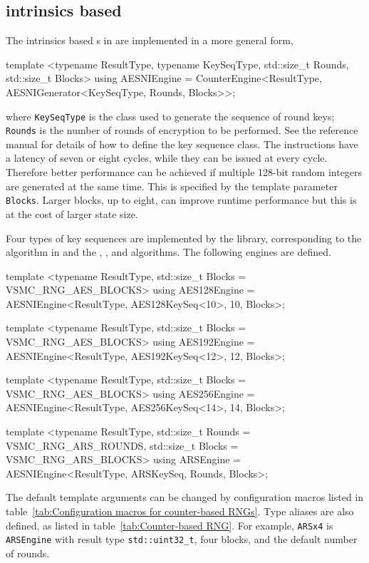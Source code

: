 \subsection{\protect\aesni intrinsics based \protect\rng}
\label{sub:AES-NI intrinsics based RNG}

The \aesni intrinsics based \rng{}s in \textcite{Salmon:2011um} are implemented
in a more general form,
\begin{cppcode}
  template <typename ResultType, typename KeySeqType, std::size_t Rounds,
      std::size_t Blocks>
  using AESNIEngine =
      CounterEngine<ResultType, AESNIGenerator<KeySeqType, Rounds, Blocks>>;
\end{cppcode}
where \verb|KeySeqType| is the class used to generate the sequence of round
keys; \verb|Rounds| is the number of rounds of \aes encryption to be performed.
See the reference manual for details of how to define the key sequence class.
The \aesni instructions have a latency of seven or eight cycles, while they can
be issued at every cycle. Therefore better performance can be achieved if
multiple 128-bit random integers are generated at the same time. This is
specified by the template parameter \verb|Blocks|. Larger blocks, up to eight,
can improve runtime performance but this is at the cost of larger state size.

Four types of key sequences are implemented by the library, corresponding to
the \ars algorithm in \textcite{Salmon:2011um} and the , , and
 algorithms. The following \rng engines are defined.
\begin{cppcode}
  template <typename ResultType, std::size_t Blocks = VSMC_RNG_AES_BLOCKS>
  using AES128Engine = AESNIEngine<ResultType, AES128KeySeq<10>, 10, Blocks>;

  template <typename ResultType, std::size_t Blocks = VSMC_RNG_AES_BLOCKS>
  using AES192Engine = AESNIEngine<ResultType, AES192KeySeq<12>, 12, Blocks>;

  template <typename ResultType, std::size_t Blocks = VSMC_RNG_AES_BLOCKS>
  using AES256Engine = AESNIEngine<ResultType, AES256KeySeq<14>, 14, Blocks>;

  template <typename ResultType, std::size_t Rounds = VSMC_RNG_ARS_ROUNDS,
      std::size_t Blocks = VSMC_RNG_ARS_BLOCKS>
  using ARSEngine = AESNIEngine<ResultType, ARSKeySeq, Rounds, Blocks>;
\end{cppcode}
The default template arguments can be changed by configuration macros listed in
table~\ref{tab:Configuration macros for counter-based RNGs}. Type aliases are
also defined, as listed in table~\ref{tab:Counter-based RNG}. For example,
\verb|ARSx4| is \verb|ARSEngine| with result type \verb|std::uint32_t|, four
blocks, and the default number of rounds.

